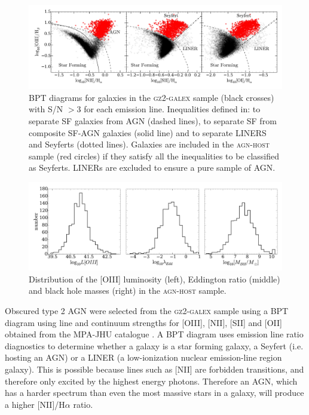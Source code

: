 \begin{figure}
\includegraphics[width=\textwidth]{agn/fig2.pdf}
\caption[BPT diagram used to select AGN host galaxies]{BPT diagrams for galaxies in the \textsc{gz2-galex} sample (black crosses) with S/N $> 3$ for each emission line. Inequalities defined in: \protect\cite{kewley01} to separate SF galaxies from AGN (dashed lines), \protect\cite{kauffmann03b} to separate SF from composite SF-AGN galaxies (solid line) and \protect\cite{kewley06} to separate LINERS and Seyferts (dotted lines).  Galaxies are included in the \textsc{agn-host} sample (red circles) if they satisfy all the inequalities to be classified as Seyferts. LINERs are excluded to ensure a pure sample of AGN.}
\label{bpt}
\end{figure}

\begin{figure}
\includegraphics[width=\textwidth]{agn/agn-host_distributions_loiii_edd_ratio_mbh.pdf}
\caption[Distribution of measured galaxy parameters in the \textsc{agn-host} sample]{Distribution of the [OIII] luminosity (left), Eddington ratio (middle) and black hole masses (right) in the \textsc{agn-host} sample.}
\label{fig:agndistributions}
\end{figure}


Obscured type 2 AGN were selected from the \textsc{gz2-galex} sample using a BPT diagram \citep*{bpt} using line and continuum strengths for [OIII], [NII], [SII] and [OII] obtained from the MPA-JHU catalogue \citep{kauffmann03, brinchmann04}. A BPT diagram uses emission line ratio diagnostics to determine whether a galaxy is a star forming galaxy, a Seyfert (i.e. hosting an AGN) or a LINER (a low-ionization nuclear emission-line region galaxy). This is possible because lines such as [NII] are forbidden transitions, and therefore only excited by the highest energy photons. Therefore an AGN, which has a harder spectrum than even the most massive stars in a galaxy, will produce a higher [NII]/H$\alpha$ ratio. 

